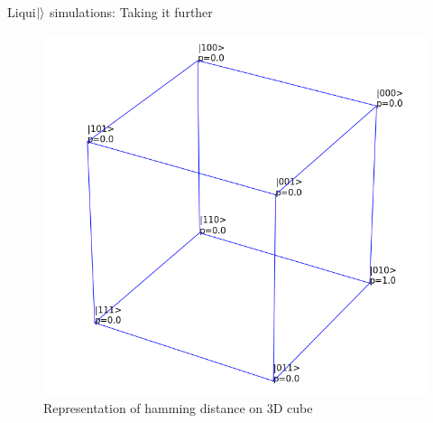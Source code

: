 \documentclass[10pt]{beamer}
\begin{document}
{
\begin{frame}{Liqui$\ket{}$ simulations: Taking it further}

\begin{figure}
\includegraphics[scale=0.35]{cube_notdiffused.png}
       \caption{\footnotesize{Representation of hamming distance on 3D cube} }
\end{figure}
\end{frame}
}
\end{document}
